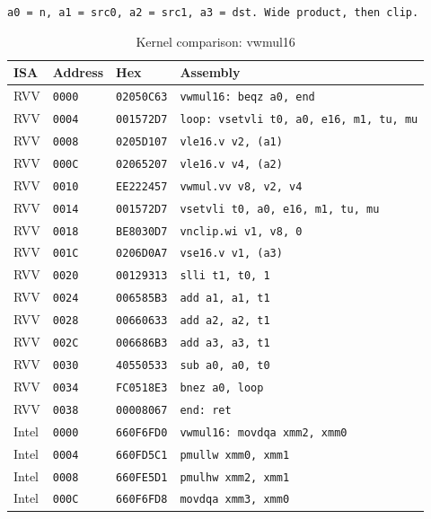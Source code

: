 \begin{table}[htbp]
\centering
\caption{Kernel comparison: vwmul16}
\begingroup
\scriptsize
\setlength{\tabcolsep}{4pt}
\noindent \texttt{a0 = n, a1 = src0, a2 = src1, a3 = dst. Wide product, then clip.}\par
\vspace{0.6ex}
\begin{tabular}{@{}l|l|l|p{7.2cm}@{}}
\toprule
ISA & Address & Hex & Assembly \\
\midrule
RVV & \texttt{0000} & \texttt{02050C63} & \texttt{vwmul16: beqz a0, end} \\
RVV & \texttt{0004} & \texttt{001572D7} & \texttt{loop: vsetvli t0, a0, e16, m1, tu, mu} \\
RVV & \texttt{0008} & \texttt{0205D107} & \texttt{vle16.v v2, (a1)} \\
RVV & \texttt{000C} & \texttt{02065207} & \texttt{vle16.v v4, (a2)} \\
RVV & \texttt{0010} & \texttt{EE222457} & \texttt{vwmul.vv v8, v2, v4} \\
RVV & \texttt{0014} & \texttt{001572D7} & \texttt{vsetvli t0, a0, e16, m1, tu, mu} \\
RVV & \texttt{0018} & \texttt{BE8030D7} & \texttt{vnclip.wi v1, v8, 0} \\
RVV & \texttt{001C} & \texttt{0206D0A7} & \texttt{vse16.v v1, (a3)} \\
RVV & \texttt{0020} & \texttt{00129313} & \texttt{slli t1, t0, 1} \\
RVV & \texttt{0024} & \texttt{006585B3} & \texttt{add a1, a1, t1} \\
RVV & \texttt{0028} & \texttt{00660633} & \texttt{add a2, a2, t1} \\
RVV & \texttt{002C} & \texttt{006686B3} & \texttt{add a3, a3, t1} \\
RVV & \texttt{0030} & \texttt{40550533} & \texttt{sub a0, a0, t0} \\
RVV & \texttt{0034} & \texttt{FC0518E3} & \texttt{bnez a0, loop} \\
RVV & \texttt{0038} & \texttt{00008067} & \texttt{end: ret} \\
\midrule
Intel & \texttt{0000} & \texttt{660F6FD0} & \texttt{vwmul16: movdqa xmm2, xmm0} \\
Intel & \texttt{0004} & \texttt{660FD5C1} & \texttt{pmullw xmm0, xmm1} \\
Intel & \texttt{0008} & \texttt{660FE5D1} & \texttt{pmulhw xmm2, xmm1} \\
Intel & \texttt{000C} & \texttt{660F6FD8} & \texttt{movdqa xmm3, xmm0} \\

\end{tabular}
\end{table}
